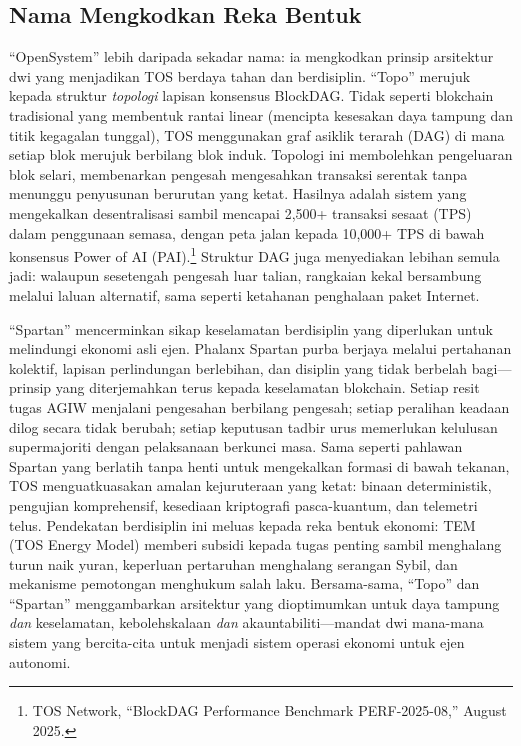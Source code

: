 \documentclass[11pt]{article}
\begin{document}
\subsection{Nama Mengkodkan Reka Bentuk}
``OpenSystem'' lebih daripada sekadar nama: ia mengkodkan prinsip arsitektur dwi yang menjadikan TOS berdaya tahan dan berdisiplin. ``Topo'' merujuk kepada struktur \emph{topologi} lapisan konsensus BlockDAG. Tidak seperti blokchain tradisional yang membentuk rantai linear (mencipta kesesakan daya tampung dan titik kegagalan tunggal), TOS menggunakan graf asiklik terarah (DAG) di mana setiap blok merujuk berbilang blok induk. Topologi ini membolehkan pengeluaran blok selari, membenarkan pengesah mengesahkan transaksi serentak tanpa menunggu penyusunan berurutan yang ketat. Hasilnya adalah sistem yang mengekalkan desentralisasi sambil mencapai 2,500+ transaksi sesaat (TPS) dalam penggunaan semasa, dengan peta jalan kepada 10,000+ TPS di bawah konsensus Power of AI (PAI).\footnote{TOS Network, ``BlockDAG Performance Benchmark PERF-2025-08,'' August 2025.} Struktur DAG juga menyediakan lebihan semula jadi: walaupun sesetengah pengesah luar talian, rangkaian kekal bersambung melalui laluan alternatif, sama seperti ketahanan penghalaan paket Internet.

``Spartan'' mencerminkan sikap keselamatan berdisiplin yang diperlukan untuk melindungi ekonomi asli ejen. Phalanx Spartan purba berjaya melalui pertahanan kolektif, lapisan perlindungan berlebihan, dan disiplin yang tidak berbelah bagi---prinsip yang diterjemahkan terus kepada keselamatan blokchain. Setiap resit tugas AGIW menjalani pengesahan berbilang pengesah; setiap peralihan keadaan dilog secara tidak berubah; setiap keputusan tadbir urus memerlukan kelulusan supermajoriti dengan pelaksanaan berkunci masa. Sama seperti pahlawan Spartan yang berlatih tanpa henti untuk mengekalkan formasi di bawah tekanan, TOS menguatkuasakan amalan kejuruteraan yang ketat: binaan deterministik, pengujian komprehensif, kesediaan kriptografi pasca-kuantum, dan telemetri telus. Pendekatan berdisiplin ini meluas kepada reka bentuk ekonomi: TEM (TOS Energy Model) memberi subsidi kepada tugas penting sambil menghalang turun naik yuran, keperluan pertaruhan menghalang serangan Sybil, dan mekanisme pemotongan menghukum salah laku. Bersama-sama, ``Topo'' dan ``Spartan'' menggambarkan arsitektur yang dioptimumkan untuk daya tampung \emph{dan} keselamatan, kebolehskalaan \emph{dan} akauntabiliti---mandat dwi mana-mana sistem yang bercita-cita untuk menjadi sistem operasi ekonomi untuk ejen autonomi.
\end{document}
